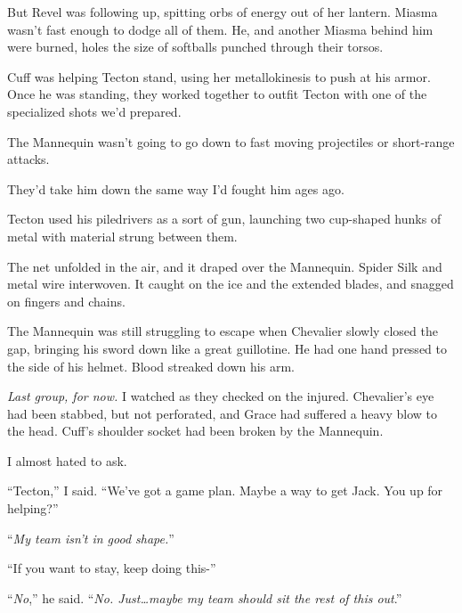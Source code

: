 But Revel was following up, spitting orbs of energy out of her lantern.  Miasma wasn't fast enough to dodge all of them.  He, and another Miasma behind him were burned, holes the size of softballs punched through their torsos.



Cuff was helping Tecton stand, using her metallokinesis to push at his armor.  Once he was standing, they worked together to outfit Tecton with one of the specialized shots we'd prepared.



The Mannequin wasn't going to go down to fast moving projectiles or short-range attacks.



They'd take him down the same way I'd fought him ages ago.



Tecton used his piledrivers as a sort of gun, launching two cup-shaped hunks of metal with material strung between them.



The net unfolded in the air, and it draped over the Mannequin.  Spider Silk and metal wire interwoven.  It caught on the ice and the extended blades, and snagged on fingers and chains.



The Mannequin was still struggling to escape when Chevalier slowly closed the gap, bringing his sword down like a great guillotine.  He had one hand pressed to the side of his helmet.  Blood streaked down his arm.



\emph{Last group, for now.  }I watched as they checked on the injured.  Chevalier's eye had been stabbed, but not perforated, and Grace had suffered a heavy blow to the head.  Cuff's shoulder socket had been broken by the Mannequin.



I almost hated to ask.



``Tecton,'' I said.  ``We've got a game plan.  Maybe a way to get Jack.  You up for helping?''



``\emph{My team isn't in good shape.}''



``If you want to stay, keep doing this-''



``\emph{No},'' he said.  ``\emph{No.  Just\ldots maybe my team should sit the rest of this out}.''



